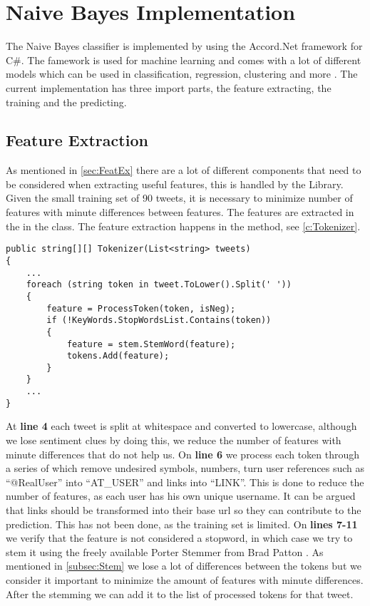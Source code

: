 \section{Naive Bayes Implementation}\label{sec:NBImp}

The Naive Bayes classifier is implemented by using the Accord.Net framework for
C\#. The famework is used for machine learning and comes with a lot of different
models which can be used in classification, regression, clustering and more
\citep{Accord}. The current implementation has three import parts, the feature
extracting, the training and the predicting.


\subsection{Feature Extraction}
As mentioned in \autoref{sec:FeatEx} there are a lot of different components
that need to be considered when extracting useful features, this is handled by
the  Library.
Given the small training set of 90 tweets, it is necessary to minimize number of features with
minute differences between features. The features are extracted in the in the
 class. The feature extraction happens in the
 method, see \autoref{c:Tokenizer}.\nl

\begin{minipage}[H]{\linewidth}
\begin{lstlisting}[caption = Split and process each token in a tweet with
regexes and stemming, label = c:Tokenizer] 
public string[][] Tokenizer(List<string> tweets)
{
    ...
    foreach (string token in tweet.ToLower().Split(' '))
    {
        feature = ProcessToken(token, isNeg);
        if (!KeyWords.StopWordsList.Contains(token))
        {
        	feature = stem.StemWord(feature);
	        tokens.Add(feature);
    	}
	}
	...
}
\end{lstlisting}
\end{minipage}

At \textbf{line 4} each tweet is split at whitespace and converted to
lowercase, although we lose sentiment clues by doing this, we reduce the number
of features with minute differences that do not help us. On \textbf{line 6} we process each
token through a series of  which remove undesired symbols,
numbers, turn user references such as ``@RealUser'' into ``AT\_USER'' and links
into ``LINK''. This is done to reduce the number of features, as each user has
his own unique username. It can be argued that links should be transformed into
their base url so they can contribute to the prediction. This has not been
done, as the training set is limited. On \textbf{lines 7-11} we verify that the
feature is not considered a stopword, in which case we try to stem it using the
freely available Porter Stemmer from Brad Patton \citep{PorterStem}. As
mentioned in \autoref{subsec:Stem} we lose a lot of differences between the
tokens but we consider it important to minimize the amount of features with
minute differences. After the stemming we can add it to the list of processed
tokens for that tweet.

